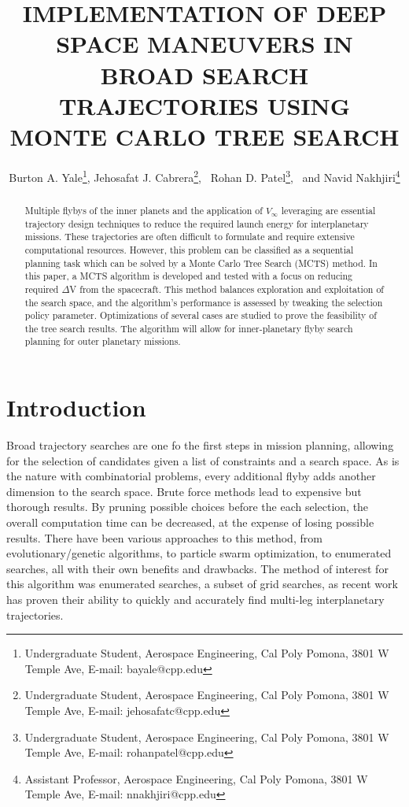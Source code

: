 \documentclass[letterpaper, preprint, paper,11pt]{AAS}	%
\begin{document}
\title{IMPLEMENTATION OF DEEP SPACE MANEUVERS IN BROAD SEARCH TRAJECTORIES USING MONTE CARLO TREE SEARCH}

\author{Burton A. Yale\thanks{Undergraduate Student, Aerospace Engineering, Cal Poly Pomona, 3801 W Temple Ave, E-mail: bayale@cpp.edu},  
Jehosafat J. Cabrera\thanks{Undergraduate Student, Aerospace Engineering, Cal Poly Pomona, 3801 W Temple Ave, E-mail: jehosafatc@cpp.edu},
\ Rohan D. Patel\thanks{Undergraduate Student, Aerospace Engineering, Cal Poly Pomona, 3801 W Temple Ave, E-mail: rohanpatel@cpp.edu},
\ and Navid Nakhjiri\thanks{Assistant Professor, Aerospace Engineering, Cal Poly Pomona, 3801 W Temple Ave, E-mail: nnakhjiri@cpp.edu}
}


\maketitle{} 		


\begin{abstract}
Multiple flybys of the inner planets and the application of $V_{\infty}$ leveraging are essential trajectory design techniques to reduce the required launch energy for interplanetary missions. These trajectories are often difficult to formulate and require extensive computational resources. However, this problem can be classified as a sequential planning task which can be solved by a Monte Carlo Tree Search (MCTS) method. In this paper, a MCTS algorithm is developed and tested with a focus on reducing required $\Delta$V from the spacecraft. This method balances exploration and exploitation of the search space, and the algorithm’s performance is assessed by tweaking the selection policy parameter. Optimizations of several cases are studied to prove the feasibility of the tree search results. The algorithm will allow for inner-planetary flyby search planning for outer planetary missions.
\end{abstract}

\section{Introduction}
Broad trajectory searches are one fo the first steps in mission planning, allowing for the selection of candidates given a list of constraints and a search space. As is the nature with combinatorial problems, every additional flyby adds another dimension to the search space. Brute force methods lead to expensive but thorough results. By pruning possible choices before the each selection, the overall computation time can be decreased, at the expense of losing possible results. There have been various approaches to this method, from evolutionary/genetic algorithms, to particle swarm optimization, to enumerated searches, all with their own benefits and drawbacks. The method of interest for this algorithm was enumerated searches, a subset of grid searches, as recent work has proven their ability to quickly and accurately find multi-leg interplanetary trajectories\cite{Hennes2015}.
\end{document}
